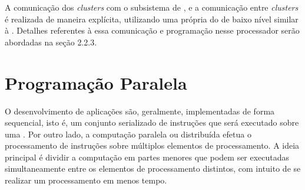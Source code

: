 A comunicação dos \textit{clusters} com o subsistema de \es, e a comunicação
entre \textit{clusters} é realizada de maneira explícita, utilizando uma \api
própria do \mppa de baixo nível similar à \posix \ipc. Detalhes referentes à
essa comunicação e programação nesse processador serão abordadas na seção
2.2.3.




\section{Programação Paralela}

O desenvolvimento de aplicações são, geralmente, implementadas de forma
sequencial, isto é, um conjunto serializado de instruções que será executado
sobre uma \cpu. Por outro lado, a computação paralela ou distribuída efetua o
processamento de instruções sobre múltiplos elementos de processamento. A ideia
principal é dividir a computação em partes menores que podem ser executadas
simultaneamente entre os elementos de processamento distintos, com intuito de se
realizar um processamento em menos tempo.

